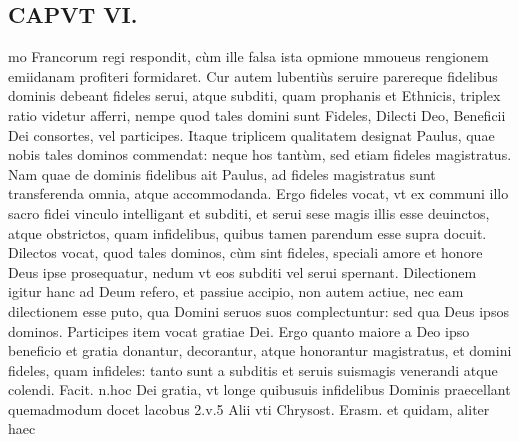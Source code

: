 \documentclass{article}
\begin{document}
\begin{pages}
\section*{CAPVT  VI. }
\marginpar{[ p.421 ]}\pstart mo Francorum regi respondit, cùm ille falsa ista opmione mmoueus rengionem emiidanam profiteri formidaret.  \pend\pstart Cur autem lubentiùs seruire parereque fidelibus dominis debeant fideles serui, atque subditi, quam prophanis et Ethnicis, triplex ratio videtur afferri, nempe quod tales domini sunt Fideles, Dilecti Deo, Beneficii Dei consortes, vel participes. Itaque triplicem qualitatem designat Paulus, quae nobis tales dominos commendat: neque hos tantùm, sed etiam fideles magistratus. Nam quae de dominis fidelibus ait Paulus, ad fideles magistratus sunt transferenda omnia, atque  accommodanda. Ergo fideles vocat, vt ex communi illo sacro fidei vinculo intelligant et subditi, et serui sese magis illis esse deuinctos, atque obstrictos, quam infidelibus, quibus tamen parendum esse supra docuit.  \pend\pstart Dilectos vocat, quod tales dominos, cùm sint fideles, speciali amore et honore Deus ipse prosequatur, nedum vt eos subditi vel serui spernant. Dilectionem igitur hanc ad Deum refero, et passiue accipio, non autem actiue, nec eam dilectionem esse puto, qua Domini seruos suos complectuntur: sed qua Deus ipsos dominos. Participes item vocat gratiae Dei. Ergo quanto maiore a Deo ipso beneficio et gratia donantur, decorantur, atque  honorantur magistratus, et domini fideles, quam infideles: tanto sunt a subditis et seruis suismagis venerandi atque  colendi. Facit. n.hoc Dei gratia, vt longe quibusuis infidelibus Dominis praecellant quemadmodum docet lacobus 2.v.5 Alii vti Chrysost. Erasm. et quidam, aliter haec  \pend

\end{pages}
\end{document}
